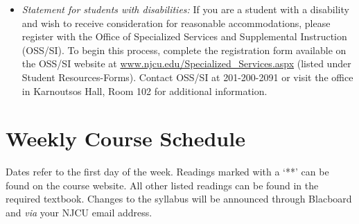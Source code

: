 \documentclass[article,oneside]{memoir}
\begin{document}
\begin{itemize}
\item \textit{Statement for students with disabilities:} If you are a student
with a disability and wish to receive consideration for reasonable
accommodations, please register with the Office of Specialized Services
and Supplemental Instruction (OSS/SI). To begin this process, complete
the registration form available on the OSS/SI website at
\href{http://www.njcu.edu/Specialized_Services.aspx}{www.njcu.edu/Specialized\_Services.aspx}
(listed under Student Resources-Forms). Contact OSS/SI at 201-200-2091
or visit the office in Karnoutsos Hall, Room 102 for additional
information.

\end{itemize}



\section{Weekly Course Schedule}
Dates refer to the first day of the week. Readings marked with a `**' can be found on the course website. All other listed readings can be found in the required textbook. Changes to the syllabus will be announced through Blacboard and \emph{via} your NJCU email address.
\end{document}
